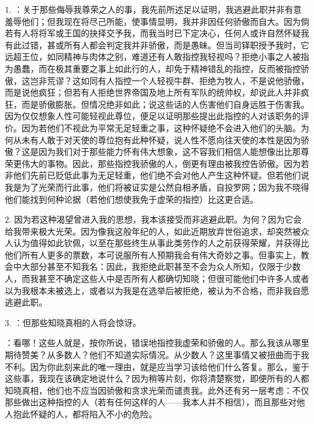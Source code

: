 1. ：关于那些侮辱我尊荣之人的事，我先前所述足以证明，我逃避此职并非有意羞辱他们；但我现在将尽己所能，使事情显明，我并非因任何骄傲而自大。因为倘若有人将将军或王国的抉择交予我，而我当时已下定决心，任何人或许自然怀疑我有此过错，甚或所有人都会判定我并非骄傲，而是愚昧。但当司铎职授予我时，它远超王位，如同精神与肉体之别，难道还有人敢指控我轻视吗？拒绝小事之人被指为愚蠢，而在极其重要之事上如此行的人，却免于精神错乱的指控，反而被指控骄傲，这岂非荒谬？这如同有人指控一个人轻视牛群、拒绝为牧人，不是说他骄傲，而是说他疯狂；但若有人拒绝世界帝国及地上所有军队的统帅权，却说此人并非疯狂，而是骄傲膨胀。但情况绝非如此；说这些话的人伤害他们自身远胜于伤害我。因为仅仅想象人性可能轻视此尊位，便足以证明那些提出此指控的人对该职务的评价。因为若他们不视此为平常无足轻重之事，这种怀疑绝不会进入他们的头脑。为何从未有人敢于对天使的尊位抱有此种怀疑，说人性不愿向往天使的本性是因为骄傲？这是因为我们对于那些能力怀有伟大想象，这不容我们相信人能想像出比那尊荣更伟大的事物。因此，那些指控我骄傲的人，倒更有理由被我控告骄傲。因为若非他们先前已贬低此事为无足轻重，他们绝不会对他人产生这种怀疑。但若他们说我是为了光荣而行此事，他们将被证实是公然自相矛盾，自投罗网；因为我不晓得他们能找到何种论据（若他们想使我免于虚荣的指控）比这更合适。\par

2. 因为若这种渴望曾进入我的思想，我本该接受而非逃避此职。为何？因为它会给我带来极大光荣。因为像我这般年纪的人，如此近期放弃世俗追求，却突然被众人认为值得如此钦佩，以至在那些终生从事此类劳作的人之前获得荣耀，并获得比他们所有人更多的票数，本可说服所有人预期我会有伟大奇妙之事。但事实上，教会中大部分甚至不知我名：因此，我拒绝此职甚至不会为众人所知，仅限于少数人，而我甚至不确定这些人中是否所有人都确切知晓；但很可能他们中许多人或者以为我根本未被选上，或者以为我是在选举后被拒绝，被认为不合格，而非我自愿逃避此职。\par

3. ：但那些知晓真相的人将会惊讶。\par

：看哪！这些人就是，按你所说，错误地指控我虚荣和骄傲的人。那么我该从哪里期待赞美？从多数人？他们不知道实际情况。从少数人？这里事情又被扭曲而于我不利。因为你此刻来此的唯一理由，就是应当学习该给他们什么答复。那么，鉴于这些事，我现在该确定地说什么？因为稍等片刻，你将清楚察觉，即便所有的人都知晓真相，他们也不应当因骄傲和贪求光荣而谴责我。此外还有另一层考虑：不仅那些做出这种指控的人（若有任何这样的人——我本人并不相信），而且那些对他人抱此怀疑的人，都将陷入不小的危险。\par

